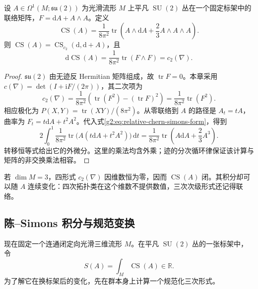 \begin{proposition}\label{g2:prop:su-two-chern-simons-form}
	设 \(A\in\Omega^1(M;\mathfrak{su}(2))\) 为光滑流形 \(M\) 上平凡 \(\operatorname{SU}(2)\) 丛在一个固定标架中的联络矩阵，\(F=\mathrm dA+A\wedge A\)。定义
	\begin{equation}\label{g2:eq:su-two-chern-simons-density}
		\operatorname{CS}(A)=\frac1{8\pi^2}\operatorname{tr}\left(A\wedge\mathrm dA+\frac23A\wedge A\wedge A\right).
	\end{equation}
	则 \(\operatorname{CS}(A)=\operatorname{CS}_{c_2}(\mathrm d,\mathrm d+A)\)，且
	\[
		\mathrm d\operatorname{CS}(A)=\frac1{8\pi^2}\operatorname{tr}(F\wedge F)=c_2(\nabla).
	\]
\end{proposition}
\begin{proof}
	\(\mathfrak{su}(2)\) 由无迹反 Hermitian 矩阵组成，故 \(\operatorname{tr}F=0\)。本章采用 \(c(\nabla)=\det(I+\mathrm iF/(2\pi))\)，其二次项为
	\[
		c_2(\nabla)=\frac1{8\pi^2}\left(\operatorname{tr}(F^2)-(\operatorname{tr}F)^2\right)=\frac1{8\pi^2}\operatorname{tr}(F^2).
	\]
	相应极化为 \(P(X,Y)=\operatorname{tr}(XY)/(8\pi^2)\)。从零联络到 \(A\) 的路径是 \(A_t=tA\)，曲率为 \(F_t=t\mathrm dA+t^2A^2\)。代入式\eqref{g2:eq:relative-chern-simons-form}，得到
	\[
		2\int_0^1\frac1{8\pi^2}\operatorname{tr}\bigl(A(t\mathrm dA+t^2A^2)\bigr)\,\mathrm dt
		=\frac1{8\pi^2}\operatorname{tr}\left(A\mathrm dA+\frac23A^3\right).
	\]
	转移恒等式给出它的外微分。这里的乘法均含外乘；迹的分次循环律保证该计算与矩阵的非交换乘法相容。
\end{proof}

若 \(\dim M=3\)，四形式 \(c_2(\nabla)\) 因维数恒为零，因而 \(\operatorname{CS}(A)\) 闭。其积分却可以随 \(A\) 连续变化：四次拓扑类在这个维数不提供数值，三次次级形式还记得联络。

\subsection{陈–Simons 积分与规范变换}
\label{g2:subsec:2204:02}
现在固定一个连通闭定向光滑三维流形 \(M\)。在平凡 \(\operatorname{SU}(2)\) 丛的一张标架中，令
\[
	S(A)=\int_M\operatorname{CS}(A)\in\mathbb R.
\]
为了解它在换标架后的变化，先在群本身上计算一个规范化三次形式。

